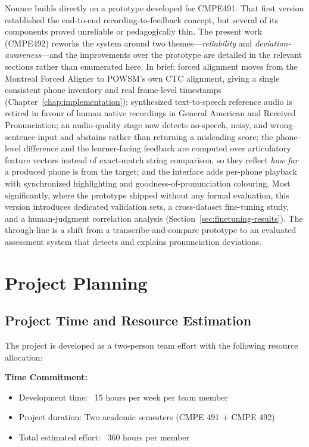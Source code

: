 \documentclass[a4paper,12pt]{report}
\begin{document}
Nounce builds directly on a prototype developed for CMPE491. That first version established the end-to-end recording-to-feedback concept, but several of its components proved unreliable or pedagogically thin. The present work (CMPE492) reworks the system around two themes---\emph{reliability} and \emph{deviation-awareness}---and the improvements over the prototype are detailed in the relevant sections rather than enumerated here. In brief: forced alignment moves from the Montreal Forced Aligner to POWSM's own CTC alignment, giving a single consistent phone inventory and real frame-level timestamps (Chapter~\ref{chap:implementation}); synthesized text-to-speech reference audio is retired in favour of human native recordings in General American and Received Pronunciation; an audio-quality stage now detects no-speech, noisy, and wrong-sentence input and abstains rather than returning a misleading score; the phone-level difference and the learner-facing feedback are computed over articulatory feature vectors instead of exact-match string comparison, so they reflect \emph{how far} a produced phone is from the target; and the interface adds per-phone playback with synchronized highlighting and goodness-of-pronunciation colouring. Most significantly, where the prototype shipped without any formal evaluation, this version introduces dedicated validation sets, a cross-dataset fine-tuning study, and a human-judgment correlation analysis (Section~\ref{sec:finetuning-results}). The through-line is a shift from a transcribe-and-compare prototype to an evaluated assessment system that detects and explains pronunciation deviations.

\section{Project Planning}
\subsection{Project Time and Resource Estimation}
The project is developed as a two-person team effort with the following resource allocation:

\textbf{Time Commitment:}
\begin{itemize}
    \item Development time: ~15 hours per week per team member
    \item Project duration: Two academic semesters (CMPE 491 + CMPE 492)
    \item Total estimated effort: ~360 hours per member
\end{itemize}
\end{document}
